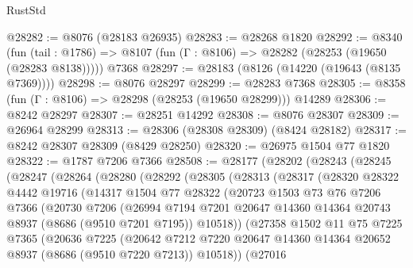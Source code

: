 \begin{lexlean}{RustStd}
\begin{coremodule}
@28282 := @8076 (@28183 @26935)
@28283 := @28268 @1820
@28292 := @8340
    (fun (tail : @1786) => @8107 (fun (Γ : @8106) => @28282 (@28253 (@19650 (@28283 @8138)))))
    @7368
@28297 := @28183 (@8126 (@14220 (@19643 (@8135 @7369))))
@28298 := @8076 @28297
@28299 := @28283 @7368
@28305 := @8358 (fun (Γ : @8106) => @28298 (@28253 (@19650 @28299))) @14289
@28306 := @8242 @28297
@28307 := @28251 @14292
@28308 := @8076 @28307
@28309 := @26964 @28299
@28313 := @28306 (@28308 @28309) (@8424 @28182)
@28317 := @8242 @28307 @28309 (@8429 @28250)
@28320 := @26975 @1504 @77 @1820
@28322 := @1787 @7206 @7366
@28508 := @28177
    (@28202
      (@28243
        (@28245
          (@28247
            (@28264
              (@28280
                (@28292
                  (@28305
                    (@28313
                      (@28317
                        (@28320
                          @28322
                          @4442
                          @19716
                          (@14317
                            @1504
                            @77
                            @28322
                            (@20723
                              @1503
                              @73
                              @76
                              @7206
                              @7366
                              (@20730
                                @7206
                                (@26994
                                  @7194
                                  @7201
                                  @20647
                                  @14360
                                  @14364
                                  @20743
                                  @8937
                                  (@8686 (@9510 @7201 @7195))
                                  @10518))
                              (@27358
                                @1502
                                @11
                                @75
                                @7225
                                @7365
                                (@20636
                                  @7225
                                  (@20642
                                    @7212
                                    @7220
                                    @20647
                                    @14360
                                    @14364
                                    @20652
                                    @8937
                                    (@8686 (@9510 @7220 @7213))
                                    @10518))
                                (@27016

\end{coremodule}
\end{lexlean}
